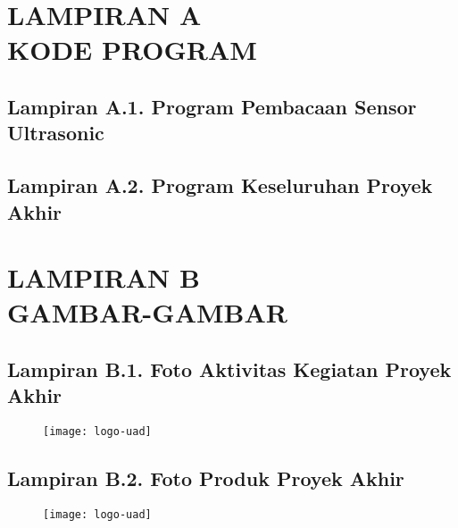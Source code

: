 
\appendix
\chapter*{LAMPIRAN A \\ KODE PROGRAM}

\section*{Lampiran A.1. Program Pembacaan Sensor Ultrasonic}
%

\hfill

\section*{Lampiran A.2. Program Keseluruhan Proyek Akhir}
%

\chapter*{LAMPIRAN B \\ GAMBAR-GAMBAR}

\section*{Lampiran B.1. Foto Aktivitas Kegiatan Proyek Akhir}
\begin{figure}[H]
    \centering
    \texttt{[image: logo-uad]}
\end{figure}

\hfill

\section*{Lampiran B.2. Foto Produk Proyek Akhir}
\begin{figure}[H]
    \centering
    \texttt{[image: logo-uad]}
\end{figure}
